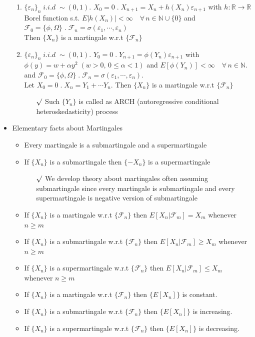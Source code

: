 \documentclass[12pt, A4]{article}
\newcommand{\rmk}{$\surd$}
\newcommand{\N}{\mathbb{N}}
\newcommand{\R}{\mathbb{R}}
\newcommand{\F}{\mathcal{F}}
\newcommand{\foranyn}{\quad \forall \, n\in \N}
\begin{document}
\begin{itemize}
\begin{enumerate}
		\item $\{\varepsilon_n\}_n\; i.i.d\;\sim (0,1)$. $X_0=0\;.\; X_{n+1}=X_n+h(X_n)\varepsilon_{n+1}$ with $h:\R\rightarrow \R$ Borel function s.t. $E|h(X_n)|<\infty\foranyn\cup\{0\}$ and $\F_0=\{\phi, \Omega\}\;.\; \F_n=\sigma(\varepsilon_1, \cdots, \varepsilon_n)$ \\ Then $\{X_n\}$ is a martingale w.r.t $\{\F_n\}$
		\item $\{\varepsilon_n\}_n\; i.i.d\; \sim (0,1)$. $Y_0=0\;. \; Y_{n+1}=\phi(Y_n)\varepsilon_{n+1}$ with $\phi(y)=w+\alpha y^2\;(w>0, \, 0\leq \alpha<1)$ and $E[\phi(Y_n)]<\infty \foranyn$. and $\F_0=\{\phi, \Omega\}\;.\; \F_n=\sigma(\varepsilon_1, \cdots, \varepsilon_n)$. \\Let $X_0=0\;.\; X_n=Y_1+\cdots Y_n$. Then $\{X_n\}$ is a martingale w.r.t $\{\F_n\}$
		\begin{itemize}
			\item[\rmk] Such $\{Y_n\}$ is called as ARCH (autoregressive conditional heteroskedasticity) process
		\end{itemize}
	\end{enumerate}
	\item Elementary facts about Martingales
	\begin{itemize}
		\item Every martingale is a submartingale and a supermartingale
		\item If $\{X_n\}$ is a submartingale then $\{-X_n\}$ is a supermartingale
		\begin{itemize}
			\item[\rmk] We develop theory about martingales often assuming submartingale since every martingale is submartingale and every supermartingale is negative version of submartingale
		\end{itemize}
		\item If $\{X_n\}$ is a martingale w.r.t $\{\F_n\}$ then $E[X_n|\F_m]=X_m$ whenever $n\geq m$
		\item If $\{X_n\}$ is a submartingale w.r.t $\{\F_n\}$ then $E[X_n|\F_m]\geq X_m$ whenever $n\geq m$
		\item If $\{X_n\}$ is a supermartingale w.r.t $\{\F_n\}$ then $E[X_n|\F_m]\leq X_m$ whenever $n\geq m$
		\item If $\{X_n\}$ is a martingale w.r.t $\{\F_n\}$ then $\{E[X_n]\}$ is constant.
		\item If $\{X_n\}$ is a submartingale w.r.t $\{\F_n\}$ then $\{E[X_n]\}$ is increasing.
		\item If $\{X_n\}$ is a supermartingale w.r.t $\{\F_n\}$ then $\{E[X_n]\}$ is decreasing.

\end{itemize}
\end{itemize}
\end{document}
